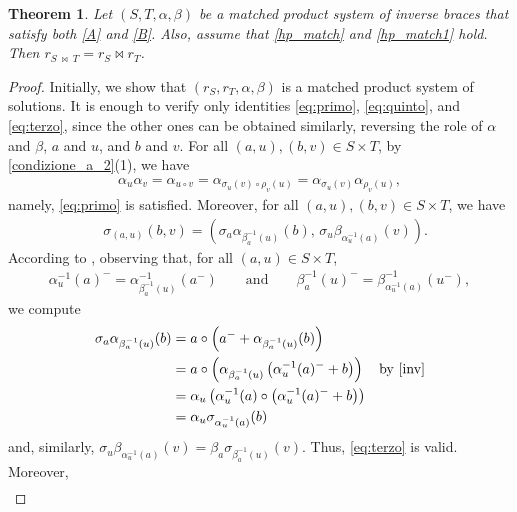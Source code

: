 \documentclass[preprint,1p]{elsarticle}
\newtheorem{theor}{Theorem}[section]
\theoremstyle{definition}               %
\begin{document}
\begin{theor}
   Let $(S, T,\alpha,\beta)$ be a matched product system of inverse braces that satisfy both \eqref{A} and \eqref{B}. Also, assume that \eqref{hp_match} and \eqref{hp_match1}
   hold.
   Then  $r_{S \ \bowtie \ T}=r_S \bowtie r_T$.
   \end{theor}
   \begin{proof}
Initially,  we show that $\left(r_S,r_T, \alpha,\beta\right)$ is a matched product system of solutions. It is enough to verify only identities \eqref{eq:primo}, \eqref{eq:quinto}, and \eqref{eq:terzo}, since the other ones can be obtained similarly, reversing the role of $\alpha$ and $\beta$, $a$ and $u$, and $b$ and $v$. For all $(a, u), (b, v) \in S   \times T$, by \cref{condizione_a_2}(1), we have
\begin{align*}
    \alpha_u\alpha_v = \alpha_{u \circ v}=\alpha_{\sigma_u\left(v\right) \circ \rho_{v}\left(u\right)}=\alpha_{\sigma_u\left(v\right)}\alpha_{\rho_{v}\left(u\right)},
\end{align*}
namely, \eqref{eq:primo} is satisfied. 
Moreover, for all $(a, u), (b, v) \in S \times T$,  we have
\begin{align*}
    &\sigma_{(a, u)}(b, v)=\left(\sigma_a\alpha_{\beta^{-1}_a(u)}(b), \, \sigma_u\beta_{\alpha^{-1}_u(a)}(v)\right).
\end{align*}
According to \cite[Lemma 11]{CaMaSt21}, observing that, for all $(a, u) \in S  \times T$,
      \begin{align}\label{inv}
 \alpha^{-1}_{u}\left(a\right)^{-}
    = \alpha^{-1}_{\beta^{-1}_{a}\left(u\right)}\left(a^{-}\right)\qquad \text{and} \qquad
    \beta^{-1}_{a}\left(u\right)^{-}
    = \beta^{-1}_{\alpha^{-1}_{u}\left(a\right)}\left(u^{-}\right),
\end{align}
we compute
\begin{align*}
    \sigma_a\alpha_{\beta^{-1}_a(u)}(b)&=a \circ \left(a^-+\alpha_{\beta^{-1}_a(u)}(b)\right)\\
    &=a \circ \left(\alpha_{\beta^{-1}_a(u)}\left(\alpha_u^{-1}(a)^-+b\right)\right) &\mbox{by \eqref{inv}}\\
    &=\alpha_u\left(\alpha_u^{-1}(a) \circ  \left(\alpha_u^{-1}(a)^-+b\right)\right)\\
    &=\alpha_u\sigma_{\alpha_u^{-1}(a)}(b)
\end{align*}
and, similarly, $\sigma_u\beta_{\alpha^{-1}_u(a)}(v)=\beta_a\sigma_{\beta_{a}^{-1}(u)}(v)$. Thus, \eqref{eq:terzo} is valid. 
Moreover,
\begin{align*}

\end{align*}
\end{proof}
\end{document}
